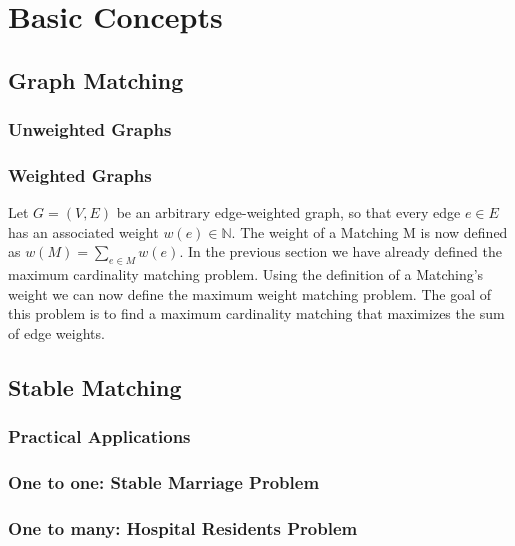 \section{Basic Concepts}
\label{sec:basic_concepts}

\subsection{Graph Matching}

\subsubsection{Unweighted Graphs}

\subsubsection{Weighted Graphs}
Let $G = (V, E)$ be an arbitrary edge-weighted graph, so that 
every edge $e \in E$ has an associated weight $w(e) \in \mathbb{N}$.
The weight of a Matching M is now defined as $w(M) = \sum_{e \in M} w(e)$.
\newline
In the previous section we have already defined the maximum cardinality
matching problem. Using the definition of a Matching's weight we can now
define the maximum weight matching problem. The goal of this problem is to 
find a maximum cardinality matching that maximizes the sum of edge weights.

\subsection{Stable Matching}

\subsubsection{Practical Applications}

\subsubsection{One to one: Stable Marriage Problem}

\subsubsection{One to many: Hospital Residents Problem}
